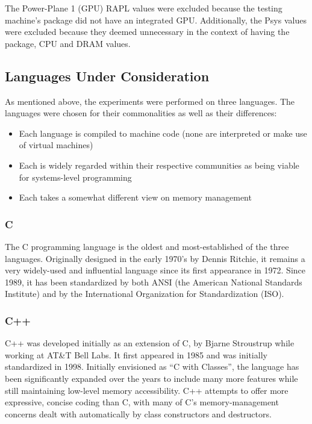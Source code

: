 The Power-Plane 1 (GPU) RAPL values were excluded because the testing machine's package did not have an integrated GPU. Additionally, the Psys values were excluded because they deemed unnecessary in the context of having the package, CPU and DRAM values.

\subsection{Languages Under Consideration}

As mentioned above, the experiments were performed on three languages. The languages were chosen for their commonalities as well as their differences:

\begin{itemize}
\item Each language is compiled to machine code (none are interpreted or make use of virtual machines)
\item Each is widely regarded within their respective communities as being viable for systems-level programming
\item Each takes a somewhat different view on memory management
\end{itemize}

\subsubsection{C}

The C programming language is the oldest and most-established of the three languages. Originally designed in the early 1970's by Dennis Ritchie, it remains a very widely-used and influential language since its first appearance in 1972. Since 1989, it has been standardized by both ANSI (the American National Standards Institute) and by the International Organization for Standardization (ISO).

\subsubsection{C++}

C++ was developed initially as an extension of C, by Bjarne Stroustrup while working at AT\&T Bell Labs. It first appeared in 1985 and was initially standardized in 1998. Initially envisioned as ``C with Classes'', the language has been significantly expanded over the years to include many more features while still maintaining low-level memory accessibility. C++ attempts to offer more expressive, concise coding than C, with many of C's memory-management concerns dealt with automatically by class constructors and destructors.

